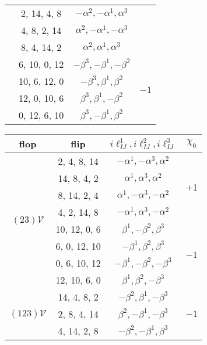 \begin{table}[!h]
\begin{tabular}{|c|c|c|c|}
			\cline{2-3}
			&2, 14, 4, 8& $-\alpha ^2,-\alpha ^1,\alpha ^3$& \\
			\cline{2-3} 
			&4, 8, 2, 14& $\alpha ^2,-\alpha ^1,-\alpha ^3$& \\
			\cline{2-3} 
			&8, 4, 14, 2& $\alpha ^2,\alpha ^1,\alpha ^3$   & \\
			\cline{2-4} 
			&6, 10, 0, 12& $-\beta ^3,-\beta ^1,-\beta ^2$   & \multirow{4}{*}{$-1$} \\
			\cline{2-3} 
			&10, 6, 12, 0& $-\beta ^3,\beta ^1,\beta ^2$   & \\
			\cline{2-3} 
			&12, 0, 10, 6& $\beta ^3,\beta ^1,-\beta ^2$   & \\
			\cline{2-3} 
			&0, 12, 6, 10& $\beta ^3,-\beta ^1,\beta ^2$& \\
			\hline
			\hline
	\end{tabular}
	\quad
	\begin{tabular}{|c|c|c|c|}
		\hline
		flop & flip & $i\ell_{IJ}^1, i\ell_{IJ}^2, i\ell_{IJ}^3 $ & $\chi_0$ \\
			\hline
			\multirow{8}{*}{$(23)\mathcal{V}$} & 2, 4, 8, 14 & $-\alpha ^1,-\alpha ^3,\alpha ^2$& \multirow{4}{*}{+1}\\
			\cline{2-3}
			&14, 8, 4, 2& $\alpha ^1,\alpha ^3,\alpha ^2$& \\
			\cline{2-3} 
			&8, 14, 2, 4& $\alpha ^1,-\alpha^3,-\alpha ^2$ & \\
			\cline{2-3} 
			&4, 2, 14, 8& $-\alpha ^1,\alpha ^3,-\alpha ^2$  & \\
			\cline{2-4} 
			&10, 12, 0, 6& $\beta ^1,-\beta ^2,\beta ^3$   & \multirow{4}{*}{$-1$} \\
			\cline{2-3} 
			&6, 0, 12, 10&  $-\beta ^1,\beta ^2,\beta ^3$  & \\
			\cline{2-3} 
			&0, 6, 10, 12&  $-\beta ^1,-\beta ^2,-\beta ^3$  & \\
			\cline{2-3} 
			&12, 10, 6, 0& $\beta ^1,\beta ^2,-\beta ^3$& \\
			\hline
			\hline
			\multirow{8}{*}{$(123)\mathcal{V}$} & 14, 4, 8, 2 & $-\beta ^2,\beta ^1,-\beta ^3$ & \multirow{4}{*}{$-1$}\\
			\cline{2-3}
			&2, 8, 4, 14& $\beta ^2,-\beta ^1,-\beta ^3$& \\
			\cline{2-3} 
			&4, 14, 2, 8& $-\beta ^2,-\beta ^1,\beta ^3$ & \\

\end{tabular}
\end{table}
